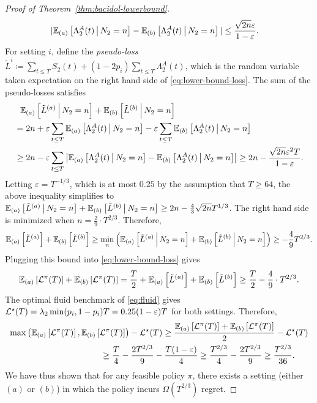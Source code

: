 \begin{proof}[Proof of Theorem~\ref{thm:bacidol-lowerbound}]
\begin{equation}\label{eq:bound-dist-diff}
\begin{aligned}
|\mathbb E_{(a)}\left[\Lambda_2^A(t) \,\middle\vert\, N_2 = n\right] - \mathbb E_{(b)}\left[\Lambda_2^A(t) \,\middle\vert\, N_2 = n\right]| &\leq \frac{\sqrt{2n}\varepsilon}{1-\varepsilon}.
\end{aligned}
\end{equation}
For setting $i$, define the \emph{pseudo-loss} $\tilde{L}^i \coloneqq \sum_{t \leq T} S_2(t) + (1-2p_i)\sum_{t\leq T} \Lambda_2^A(t)$, which is the random variable taken expectation on the right hand side of \eqref{eq:lower-bound-loss}. The sum of the pseudo-losses satisfies
\begin{align*}
&~~\mathbb E_{(a)}\left[\tilde{L}^{(a)} \,\middle\vert\, N_2 = n\right] + \mathbb E_{(b)}\left[\tilde{L}^{(b)} \,\middle\vert\, N_2 = n\right] \\
&= 2n+\varepsilon\sum_{t \leq T} \mathbb E_{(a)}\left[\Lambda_2^A(t) \,\middle\vert\, N_2 = n\right]-\varepsilon \sum_{t \leq T} \mathbb E_{(b)}\left[\Lambda_2^A(t) \,\middle\vert\, N_2 = n\right]\\
&\geq 2n - \varepsilon \sum_{t \leq T} \left|\mathbb E_{(a)}\left[\Lambda_2^A(t) \,\middle\vert\, N_2 = n\right] - \mathbb E_{(b)}\left[\Lambda_2^A(t) \,\middle\vert\, N_2 = n\right]\right| \geq 2n - \frac{\sqrt{2n}\varepsilon^2 T}{1-\varepsilon}.
\end{align*}
Letting $\varepsilon = T^{-1/3}$, which is at most $0.25$ by the assumption that $T \geq 64$, the above inequality simplifies to 
$\mathbb E_{(a)}\left[\tilde{L}^{(a)} \,\middle\vert\, N_2 = n\right] + \mathbb E_{(b)}\left[\tilde{L}^{(b)} \,\middle\vert\, N_2 = n\right] \geq 2n - \frac{4}{3}\sqrt{2n}T^{1/3}$. The right hand side is minimized when $n = \frac{2}{9}\cdot T^{2/3}$. Therefore,
\[
\mathbb E_{(a)}\left[\tilde{L}^{(a)}\right] + \mathbb E_{(b)}\left[\tilde{L}^{(b)}\right] \geq \min_{n} \left(\mathbb E_{(a)}\left[\tilde{L}^{(a)} \,\middle\vert\, N_2 = n\right] + \mathbb E_{(b)}\left[\tilde{L}^{(b)} \,\middle\vert\, N_2 = n\right]\right) \geq -\frac{4}{9}T^{2/3}.
\]
Plugging this bound into \eqref{eq:lower-bound-loss} gives
\[
\mathbb E_{(a)}\left[\mathcal{L}^{\pi}(T)\right] + \mathbb E_{(b)}\left[\mathcal{L}^{\pi}(T)\right] = \frac{T}{2} + \mathbb E_{(a)}\left[\tilde{L}^{(a)}\right] + \mathbb E_{(b)}\left[\tilde{L}^{(b)}\right] \geq \frac{T}{2} - \frac{4}{9}\cdot T^{2/3}.
\]
The optimal fluid benchmark of \eqref{eq:fluid} gives $\mathcal{L}^\star(T) = \lambda_2\min(p_i,1-p_i)T = 0.25(1-\varepsilon)T$ for both settings. Therefore,
\begin{align*}
\max\left(\expectsub{(a)}{\set{L}^{\pi}(T)}, \expectsub{(b)}{\set{L}^{\pi}(T)}\right) - \set{L}^\star(T) &\geq \frac{\expectsub{(a)}{\set{L}^{\pi}(T)} + \expectsub{(b)}{\set{L}^{\pi}(T)}}{2} - \set{L}^\star(T) \\
&\hspace{-1in}\geq \frac{T}{4} - \frac{2 T^{2/3}}{9} - \frac{T(1-\varepsilon)}{4} \geq \frac{T^{2/3}}{4} - \frac{2 T^{2/3}}{9} \geq \frac{T^{2/3}}{36}.
\end{align*}
We have thus shown that for any feasible policy $\pi$, there exists a setting (either $(a)$ or $(b)$) in which the policy incurs $\Omega(T^{2/3})$ regret.
\end{proof} 

